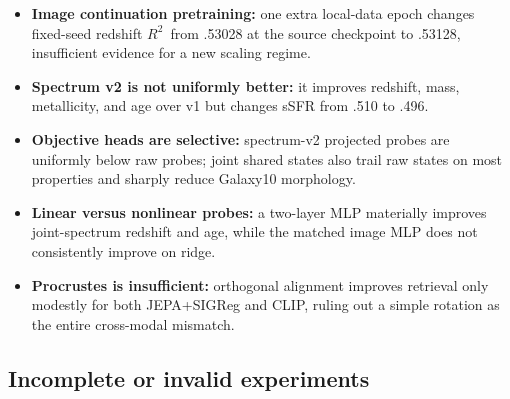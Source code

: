 \documentclass{article}
\newcommand{\rscore}{$R^2$}
\begin{document}
\begin{itemize}
    \item \textbf{Image continuation pretraining:} one extra local-data epoch
    changes fixed-seed redshift \rscore\ from .53028 at the source checkpoint
    to .53128, insufficient evidence for a new scaling regime.
    \item \textbf{Spectrum v2 is not uniformly better:} it improves redshift,
    mass, metallicity, and age over v1 but changes sSFR from .510 to .496.
    \item \textbf{Objective heads are selective:} spectrum-v2 projected probes
    are uniformly below raw probes; joint shared states also trail raw states
    on most properties and sharply reduce Galaxy10 morphology.
    \item \textbf{Linear versus nonlinear probes:} a two-layer MLP materially
    improves joint-spectrum redshift and age, while the matched image MLP does
    not consistently improve on ridge.
    \item \textbf{Procrustes is insufficient:} orthogonal alignment improves
    retrieval only modestly for both JEPA+SIGReg and CLIP, ruling out a simple
    rotation as the entire cross-modal mismatch.
\end{itemize}

\subsection{Incomplete or invalid experiments}
\end{document}
